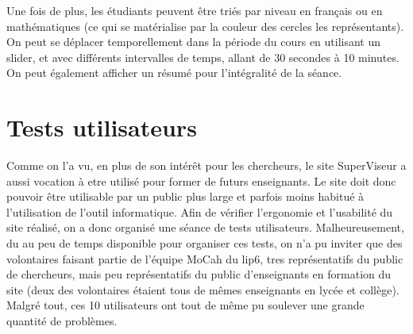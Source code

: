 \documentclass{article}
\begin{document}
\begin{itemize}
\begin{center}
        \end{center}
        Une fois de plus, les étudiants peuvent être triés par niveau en français ou en mathématiques (ce qui se matérialise par la couleur des cercles les représentants). On peut se déplacer temporellement dans la période du cours en utilisant un slider, et avec différents intervalles de temps, allant de 30 secondes à 10 minutes. On peut également afficher un résumé pour l'intégralité de la séance.\\
\end{itemize}

\section{Tests utilisateurs}
Comme on l'a vu, en plus de son intérêt pour les chercheurs, le site SuperViseur a aussi vocation à etre utilisé pour former de futurs enseignants. Le site doit donc pouvoir être utilisable par un public plus large et parfois moins habitué à l'utilisation de l'outil informatique. Afin de vérifier l'ergonomie et l'usabilité du site réalisé, on a donc organisé une séance de tests utilisateurs. Malheureusement, du au peu de temps disponible pour organiser ces tests, on n'a pu inviter que des volontaires faisant partie de l'équipe MoCah du lip6, tres représentatifs du public de chercheurs, mais peu représentatifs du public d'enseignants en formation du site (deux des volontaires étaient tous de mêmes enseignants en lycée et collège). Malgré tout, ces 10 utilisateurs ont tout de même pu soulever une grande quantité de problèmes.
\end{document}
